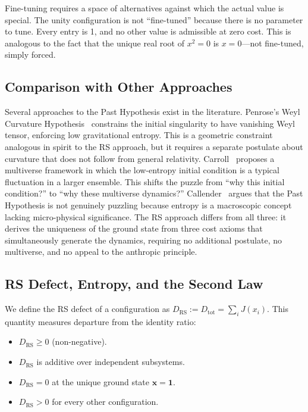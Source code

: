 \documentclass[12pt,a4paper]{article}
\theoremstyle{definition}
\theoremstyle{remark}
\begin{document}
Fine-tuning requires a space of alternatives against which the actual value
is special.  The unity configuration is not ``fine-tuned'' because there is
no parameter to tune.  Every entry is 1, and no other value is admissible
at zero cost.  This is analogous to the fact that the unique real root of
$x^2 = 0$ is $x = 0$---not fine-tuned, simply forced.

\subsection{Comparison with Other Approaches}

Several approaches to the Past Hypothesis exist in the literature.
Penrose's Weyl Curvature Hypothesis~\cite{Penrose1989} constrains the
initial singularity to have vanishing Weyl tensor, enforcing low
gravitational entropy.  This is a geometric constraint analogous in spirit
to the RS approach, but it requires a separate postulate about curvature
that does not follow from general relativity.  Carroll~\cite{Carroll2010}
proposes a multiverse framework in which the low-entropy initial condition
is a typical fluctuation in a larger ensemble.  This shifts the puzzle
from ``why this initial condition?'' to ``why these multiverse dynamics?''
Callender~\cite{Callender2004} argues that the Past Hypothesis is not
genuinely puzzling because entropy is a macroscopic concept lacking
micro-physical significance.  The RS approach differs from all three: it
derives the uniqueness of the ground state from three cost axioms that
simultaneously generate the dynamics, requiring no additional postulate,
no multiverse, and no appeal to the anthropic principle.

\subsection{RS Defect, Entropy, and the Second Law}

We define the RS defect of a configuration as
$D_{\mathrm{RS}} := D_{\mathrm{tot}} = \sum_i J(x_i)$.  This quantity
measures departure from the identity ratio:
\begin{itemize}[nosep]
  \item $D_{\mathrm{RS}} \geq 0$ (non-negative).
  \item $D_{\mathrm{RS}}$ is additive over independent subsystems.
  \item $D_{\mathrm{RS}} = 0$ at the unique ground state $\mathbf{x} = \mathbf{1}$.
  \item $D_{\mathrm{RS}} > 0$ for every other configuration.
\end{itemize}
\end{document}
